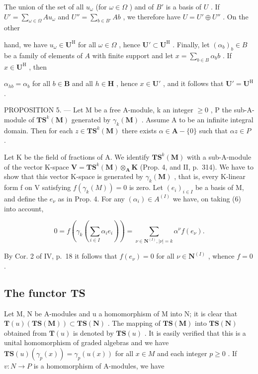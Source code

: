The union of the set of all \(u_{\omega}\) (for \(\omega \in \Omega\) ) and of \(B'\) is a basis of \(U\) . If \(U' = \sum_{\omega \in \Omega} Au_{\omega}\) and \(U'' = \sum_{b \in B'} Ab\) , we therefore have \(U = U' \oplus U''\) . On the other

hand, we have \(u_{\omega} \in \mathbf{U}^{\mathrm{H}}\) for all \(\omega \in \Omega\) , hence \(\mathbf{U}' \subset \mathbf{U}^{\mathrm{H}}\) . Finally, let \((\alpha_b)_b \in B\) be a family of elements of \(A\) with finite support and let \(x = \sum_{b \in B} \alpha_b b\) . If \(x \in \mathbf{U}^{\mathrm{H}}\) , then

\(\alpha_{hb} = \alpha_b\) for all \(b \in \mathbf{B}\) and all \(h \in \mathbf{H}\) , hence \(x \in \mathbf{U}'\) , and it follows that \(\mathbf{U}' = \mathbf{U}^{\mathrm{H}}\) .

PROPOSITION 5. --- Let M be a free A-module, k an integer \(\geqslant0\) , P the sub-A-module of \(\mathbf{TS}^{k}(\mathbf{M})\) generated by \(\gamma_{k}(\mathbf{M})\) . Assume A to be an infinite integral domain. Then for each \(z\in\mathbf{TS}^{k}(\mathbf{M})\) there exists \(\alpha\in\mathbf{A}-\{0\}\) such that \(\alpha z\in P\) .

Let K be the field of fractions of A. We identify \(\mathbf{T}\mathbf{S}^{k}(\mathbf{M})\) with a sub-A-module of the vector K-space \(\mathbf{V} = \mathbf{T}\mathbf{S}^{k}(\mathbf{M}) \otimes_{\mathbf{A}} \mathbf{K}\) (Prop. 4, and II, p.~314). We have to show that this vector K-space is generated by \(\gamma_{k}(\mathbf{M})\) , that is, every K-linear form f on V satisfying \(f(\gamma_k(M)) = 0\) is zero. Let \((e_i)_{i \in I}\) be a basis of M, and define the \(e_\nu\) as in Prop. 4. For any \((\alpha_i) \in A^{(I)}\) we have, on taking (6) into account,

\[
0 = f \left(\gamma_ {k} \left(\sum_ {i \in I} \alpha_ {i} e _ {i}\right)\right) = \sum_ {\nu \in \mathbf {N} ^ {(I)}, | \nu | = k} \alpha^ {\nu} f (e _ {\nu}).
\]

By Cor. 2 of IV, p.~18 it follows that \(f(e_{\nu}) = 0\) for all \(\nu \in \mathbf{N}^{(I)}\) , whence \(f = 0\) .

\subsection{The functor TS}

Let M, N be A-modules and u a homomorphism of M into N; it is clear that \(\mathbf{T}(u)(\mathbf{TS}(\mathbf{M})) \subset \mathbf{TS}(\mathbf{N})\) . The mapping of \(\mathbf{TS}(\mathbf{M})\) into \(\mathbf{TS}(\mathbf{N})\) obtained from \(\mathbf{T}(u)\) is denoted by \(\mathbf{TS}(u)\) . It is easily verified that this is a unital homomorphism of graded algebras and we have \(\mathbf{TS}(u)\left(\gamma_{p}(x)\right) = \gamma_{p}(u(x))\) for all \(x \in M\) and each integer \(p \geqslant 0\) . If \(v : N \to P\) is a homomorphism of A-modules, we have

